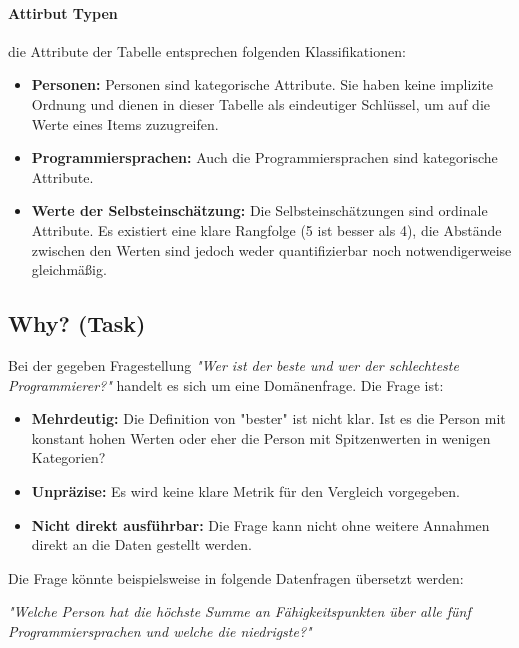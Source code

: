 \documentclass[12pt, a4paper]{article}
\begin{document}
\paragraph{Attirbut Typen}
die Attribute der Tabelle entsprechen folgenden Klassifikationen:
\begin{itemize}
  \item \textbf{Personen:} Personen sind kategorische Attribute. Sie haben keine implizite Ordnung und dienen in dieser Tabelle 
    als eindeutiger Schlüssel, um auf die Werte eines Items zuzugreifen.
  \item \textbf{Programmiersprachen:} Auch die Programmiersprachen sind kategorische Attribute.
  \item \textbf{Werte der Selbsteinschätzung:} Die Selbsteinschätzungen sind ordinale Attribute. Es existiert eine klare Rangfolge (5 ist besser als 4),
    die Abstände zwischen den Werten sind jedoch weder quantifizierbar noch notwendigerweise gleichmäßig.
\end{itemize}



\subsection*{Why? (Task)}
Bei der gegeben Fragestellung \emph{"Wer ist der beste und wer der schlechteste Programmierer?"} handelt es sich um eine Domänenfrage.\newline
Die Frage ist:
\begin{itemize}
  \item \textbf{Mehrdeutig:} Die Definition von "bester" ist nicht klar. Ist es die Person mit konstant hohen Werten oder eher die Person mit Spitzenwerten
    in wenigen Kategorien?
  \item \textbf{Unpräzise:} Es wird keine klare Metrik für den Vergleich vorgegeben.
  \item \textbf{Nicht direkt ausführbar:} Die Frage kann nicht ohne weitere Annahmen direkt an die Daten gestellt werden.
\end{itemize}

Die Frage könnte beispielsweise in folgende Datenfragen übersetzt werden:
\begin{center}
  \textit{"Welche Person hat die höchste Summe an Fähigkeitspunkten über alle fünf Programmiersprachen und welche die niedrigste?"}
\end{center}
\end{document}
